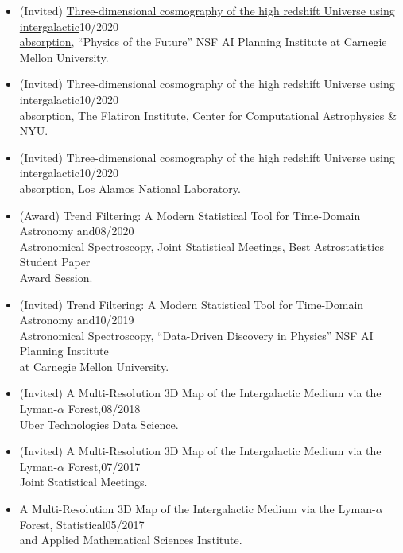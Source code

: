 \documentclass[letterpaper,10pt]{extarticle}
\begin{document}
\begin{itemize}[itemsep=0.25cm, leftmargin=0cm, rightmargin=0cm]
\item[] (Invited) \href{https://youtu.be/89vjQxVIDpI}{Three-dimensional cosmography of the high redshift Universe using intergalactic}\hspace*{\fill}10/2020\\  \href{https://youtu.be/89vjQxVIDpI}{absorption}, ``Physics of the Future'' NSF AI Planning Institute at Carnegie Mellon University.
\item[] (Invited) Three-dimensional cosmography of the high redshift Universe using intergalactic\hspace*{\fill}10/2020\\  absorption, The Flatiron Institute, Center for Computational Astrophysics \& NYU.
\item[] (Invited) Three-dimensional cosmography of the high redshift Universe using intergalactic\hspace*{\fill}10/2020\\  absorption, Los Alamos National Laboratory.
\item[] (Award) Trend Filtering: A Modern Statistical Tool for Time-Domain Astronomy and\hspace*{\fill}08/2020\\ Astronomical Spectroscopy, Joint Statistical Meetings, Best Astrostatistics Student Paper\\ Award Session.
\item[] (Invited) Trend Filtering: A Modern Statistical Tool for Time-Domain Astronomy and\hspace*{\fill}10/2019\\ Astronomical Spectroscopy, ``Data-Driven Discovery in Physics'' NSF AI Planning Institute\\ at Carnegie Mellon University.
\item[] (Invited) A Multi-Resolution 3D Map of the Intergalactic Medium via the Lyman-$\alpha$ Forest,\hspace*{\fill}08/2018\\ Uber Technologies Data Science.
\item[] (Invited) A Multi-Resolution 3D Map of the Intergalactic Medium via the Lyman-$\alpha$ Forest,\hspace*{\fill}07/2017\\ Joint Statistical Meetings.
\item[] A Multi-Resolution 3D Map of the Intergalactic Medium via the Lyman-$\alpha$ Forest, Statistical\hspace*{\fill}05/2017\\ and Applied Mathematical Sciences Institute.

\end{itemize}
\end{document}
